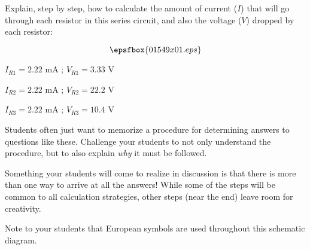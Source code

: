 

Explain, step by step, how to calculate the amount of current ($I$) that will go through each resistor in this series circuit, and also the voltage ($V$) dropped by each resistor:

$$\epsfbox{01549x01.eps}$$







\medskip
\item {} $I_{R1} = 2.22$ mA ; $V_{R1} = 3.33$ V
\item {} $I_{R2} = 2.22$ mA ; $V_{R2} = 22.2$ V
\item {} $I_{R3} = 2.22$ mA ; $V_{R3} = 10.4$ V
\medskip







Students often just want to memorize a procedure for determining answers to questions like these.  Challenge your students to not only understand the procedure, but to also explain {\it why} it must be followed.

Something your students will come to realize in discussion is that there is more than one way to arrive at all the answers!  While some of the steps will be common to all calculation strategies, other steps (near the end) leave room for creativity.

Note to your students that European symbols are used throughout this schematic diagram.




